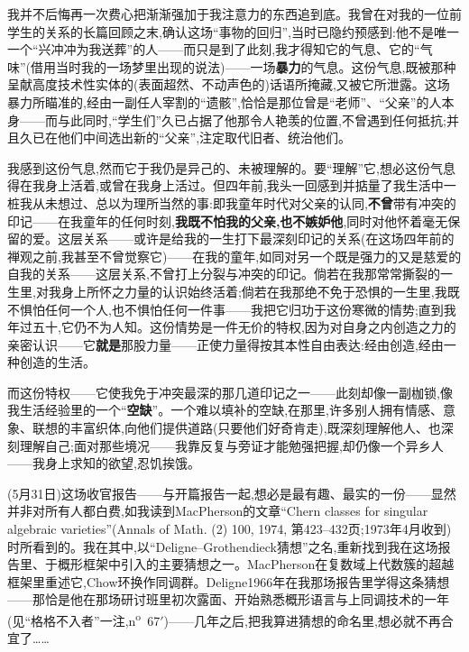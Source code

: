 我并不后悔再一次费心把渐渐强加于我注意力的东西追到底。我曾在对我的一位前学生的关系的长篇回顾之末,确认这场“事物的回归”,当时已隐约预感到:他不是唯一一个“兴冲冲为我送葬”的人——而只是到了此刻,我才得知它的气息、它的“气味”(借用当时我的一场梦里出现的说法)——一场\textbf{暴力}的气息。这份气息,既被那种呈献高度技术性实体的(表面超然、不动声色的)话语所掩藏,又被它所泄露。这场暴力所瞄准的,经由一副任人宰割的“遗骸”,恰恰是那位曾是“老师”、“父亲”的人本身——而与此同时,“学生们”久已占据了他那令人艳羡的位置,不曾遇到任何抵抗;并且\dmark{}久已在他们中间选出新的“父亲”,注定取代旧者、统治他们。

我感到这份气息,然而它于我仍是异己的、未被理解的。要“理解”它,想必这份气息得在我身上活着,或曾在我身上活过。但四年前,我头一回感到并掂量了我生活中一桩我从未想过、总以为理所当然的事:即我童年时代对父亲的认同,\textbf{不曾}带有冲突的印记——在我童年的任何时刻,\textbf{我既不怕我的父亲,也不嫉妒他},同时对他怀着毫无保留的爱。这层关系——或许是给我的一生打下最深刻印记的关系(在这场四年前的禅观之前,我甚至不曾觉察它)——在我的童年,如同对另一个既是强力的又是慈爱的自我的关系——这层关系,不曾打上分裂与冲突的印记。倘若在我那常常撕裂的一生里,对我身上所怀之力量的认识始终活着;倘若在我那绝不免于恐惧的一生里,我既不惧怕任何一个人,也不惧怕任何一件事——我把它归功于这份寒微的情势;直到我年过五十,它仍不为人知。这份情势是一件无价的特权,因为对自身之内创造之力的亲密认识——它\textbf{就是}那股力量——正使力量得按其本性自由表达:经由创造,经由一种创造的生活。

而这份特权——它使我免于冲突最深的那几道印记之一——此刻却像一副枷锁,像我生活经验里的一个“\textbf{空缺}”。一个难以填补的空缺,在那里,许多别人拥有情感、意象、联想的丰富织体,向他们提供道路(只要他们好奇肯走),既深刻理解他人、也深刻理解自己;面对那些境况——我靠反复与旁证才能勉强把握,却仍像一个异乡人——我身上求知的欲望,忍饥挨饿。


(5月31日)这场收官报告——与开篇报告一起,想必是最有趣、最实的一份——显然并非对所有人都白费,如我读到MacPherson的文章“Chern classes for singular algebraic varieties”(Annals of Math. (2) 100, 1974, 第423--432页;1973年4月收到)时所看到的。我在其中,以“Deligne--Grothendieck猜想”之名,重新找到我在这场报告里、于概形框架中引入的主要猜想之一\dmark{}。MacPherson在复数域上代数簇的超越框架里重述它,Chow环换作同调群。Deligne1966年在我那场报告里学得这条猜想——那恰是他在那场研讨班里初次露面、开始熟悉概形语言与上同调技术的一年(见“格格不入者”一注,n\textsuperscript{o}~67$'$)——几年之后,把我算进猜想的命名里,想必就不再合宜了……


